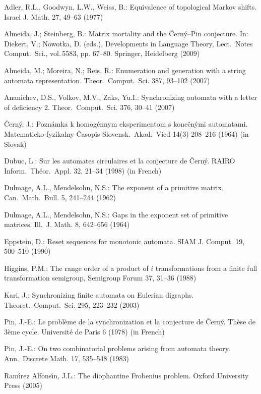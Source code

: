 \documentclass[11pt]{llncs}
\begin{document}
\begin{thebibliography}{99}
Adler, R.L., Goodwyn, L.W., Weiss, B.: Equivalence of topological Markov shifts.
Israel J. Math. 27, 49--63 (1977)

Almeida, J.; Steinberg, B.: Matrix mortality and the \v{C}ern\'{y}--Pin
conjecture. In:  Diekert, V.; Nowotka, D. (eds.), Developments in
Language Theory, Lect.\ Notes Comput.\ Sci., vol.\,5583, pp. 67--80.
Springer, Heidelberg (2009)

Almeida, M.; Moreira, N.; Reis, R.: Enumeration and generation with a string
automata representation. Theor.\ Comput.\ Sci. 387, 93--102 (2007)

Ananichev, D.S., Volkov, M.V., Zaks, Yu.I.: Synchronizing automata
with a letter of deficiency 2. Theor.\ Comput.\ Sci. 376, 30--41 (2007)

\v{C}ern\'{y}, J.: Pozn\'{a}mka k homog\'{e}nnym eksperimentom s
kone\v{c}n\'{y}mi automatami. Matematicko-fyzikalny \v{C}asopis
Slovensk.\ Akad.\ Vied 14(3) 208--216 (1964) (in Slovak)

Dubuc, L.: Sur les automates circulaires et la conjecture de
\v{C}ern\'y. RAIRO Inform.\ Th\'eor.\ Appl. 32, 21--34 (1998) (in
French)

Dulmage, A.L., Mendelsohn, N.S.: The exponent of a primitive matrix.
Can.\ Math.\ Bull. 5, 241--244 (1962)

Dulmage, A.L., Mendelsohn, N.S.: Gaps in the exponent set of primitive
matrices. Ill.\ J. Math. 8, 642--656 (1964)

Eppstein, D.: Reset sequences for monotonic automata. SIAM J.
Comput. 19, 500--510 (1990)

Higgins, P.M.: The range order of a product of $i$ transformations
from a finite full transformation semigroup, Semigroup Forum 37, 31--36
(1988)

Kari, J.: Synchronizing finite automata on Eulerian digraphs.
Theoret.\ Comput.\ Sci. 295, 223--232 (2003)

Pin, J.-E.: Le probl\`eme de la synchronization et la conjecture de
\v{C}ern\'y. Th\`ese de 3\`eme cycle. Universit\'e de Paris 6 (1978) (in
French)

Pin, J.-E.: On two combinatorial problems arising from automata
theory. Ann.\ Discrete Math. 17, 535--548 (1983)

Ram\'{\i}rez Alfons\'{\i}n, J.L.: The diophantine Frobenius problem.
Oxford University Press (2005)


\end{thebibliography}
\end{document}
